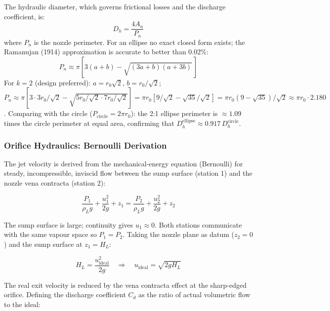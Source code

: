 \documentclass[11pt,letterpaper]{article}
\newcommand{\rhoL}{\rho_L}
\begin{document}
The hydraulic diameter, which governs frictional losses and the discharge
coefficient, is:
\begin{equation}
  D_h = \frac{4 A_n}{P_n}
  \label{eq:dh}
\end{equation}
where $P_n$ is the nozzle perimeter.  For an ellipse no exact closed form
exists; the Ramanujan (1914) approximation is accurate to better than
0.02\%:
\begin{equation}
  P_n \approx \pi\!\left[3(a+b) - \sqrt{(3a+b)(a+3b)}\,\right]
  \label{eq:perimeter}
\end{equation}
For $k = 2$ (design preferred): $a = r_0\sqrt{2}$, $b = r_0/\sqrt{2}$;
$P_n \approx \pi\!\left[3 \cdot 3r_0/\sqrt{2} - \sqrt{5r_0/\sqrt{2} \cdot
7r_0/\sqrt{2}}\right] = \pi r_0[9/\sqrt{2} - \sqrt{35}/\sqrt{2}]
= \pi r_0(9 - \sqrt{35})/\sqrt{2} \approx \pi r_0 \cdot 2.180$.
Comparing with the circle ($P_{\mathrm{circle}} = 2\pi r_0$): the
2:1 ellipse perimeter is $\approx 1.09$ times the circle perimeter at
equal area, confirming that $D_h^{\mathrm{ellipse}} \approx 0.917\,D_h^{\mathrm{circle}}$.

\subsubsection{Orifice Hydraulics: Bernoulli Derivation}
\label{sec:bernoulli}

The jet velocity is derived from the mechanical-energy equation (Bernoulli)
for steady, incompressible, inviscid flow between the sump surface (station
1) and the nozzle vena contracta (station 2):

\begin{equation}
  \frac{P_1}{\rhoL g} + \frac{u_1^2}{2g} + z_1
  = \frac{P_2}{\rhoL g} + \frac{u_2^2}{2g} + z_2
  \label{eq:bernoulli}
\end{equation}

The sump surface is large; continuity gives $u_1 \approx 0$.  Both stations
communicate with the same vapour space so $P_1 = P_2$.  Taking the nozzle
plane as datum ($z_2 = 0$) and the sump surface at $z_1 = H_L$:

\begin{equation}
  H_L = \frac{u_{\mathrm{ideal}}^2}{2g}
  \quad\Rightarrow\quad
  u_{\mathrm{ideal}} = \sqrt{2g H_L}
  \label{eq:ideal_velocity}
\end{equation}

The real exit velocity is reduced by the vena contracta effect at the
sharp-edged orifice.  Defining the discharge coefficient $C_d$ as the ratio
of actual volumetric flow to the ideal:
\end{document}
